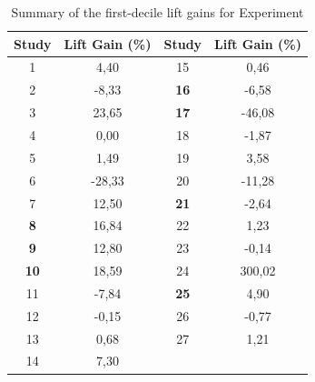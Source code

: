 \begin{table}[h]
\centering
\begin{tabular}{|c|c|c|c|}
\hline
\textbf{Study} & \textbf{Lift Gain (\%)}        & \textbf{Study} & \textbf{Lift Gain (\%)}        \\ \hline
1              & \cellcolor[HTML]{8ed08e}4,40   & 15             & \cellcolor[HTML]{8ed08e}0,46   \\ \hline
2              & \cellcolor[HTML]{ff514d}-8,33  & \textbf{16}    & \cellcolor[HTML]{ff514d}-6,58  \\ \hline
3              & \cellcolor[HTML]{ffce93}23,65  & \textbf{17}    & \cellcolor[HTML]{ffce93}-46,08 \\ \hline
4              & 0,00                           & 18             & \cellcolor[HTML]{ffccc9}-1,87  \\ \hline
5              & \cellcolor[HTML]{8ed08e}1,49   & 19             & \cellcolor[HTML]{8ed08e}3,58   \\ \hline
6              & \cellcolor[HTML]{ffce93}-28,33 & 20             & \cellcolor[HTML]{ff514d}-11,28 \\ \hline
7              & \cellcolor[HTML]{8ed08e}12,50  & \textbf{21}    & \cellcolor[HTML]{ffccc9}-2,64  \\ \hline
\textbf{8}     & \cellcolor[HTML]{8ed08e}16,84  & 22             & \cellcolor[HTML]{8ed08e}1,23   \\ \hline
\textbf{9}     & \cellcolor[HTML]{8ed08e}12,80  & 23             & \cellcolor[HTML]{ffccc9}-0,14  \\ \hline
\textbf{10}    & \cellcolor[HTML]{8ed08e}18,59  & 24             & \cellcolor[HTML]{ffce93}300,02 \\ \hline
11             & \cellcolor[HTML]{ff514d}-7,84  & \textbf{25}    & \cellcolor[HTML]{8ed08e}4,90   \\ \hline
12             & \cellcolor[HTML]{ffccc9}-0,15  & 26             & \cellcolor[HTML]{ffccc9}-0,77  \\ \hline
13             & \cellcolor[HTML]{8ed08e}0,68   & 27             & \cellcolor[HTML]{8ed08e}1,21   \\ \hline
14             & \cellcolor[HTML]{8ed08e}7,30   &                &                                \\ \hline
\end{tabular}
\caption{Summary of the first-decile lift gains for Experiment \nameExperimentII}
\label{table:lift_gain_exp-ii}
\end{table}

